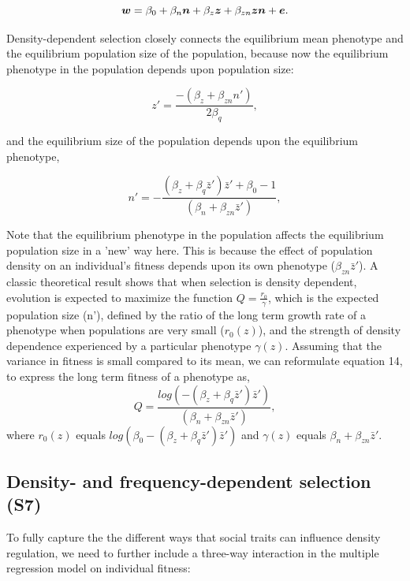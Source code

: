 \documentclass{article}
\begin{document}
\begin{equation} \label{eq: DDRS}
\vectorsym{w}=\beta_{0} +\beta_{n} \vectorsym{n} + \beta_{z} \vectorsym{z}+  \beta_{zn} \vectorsym{zn}  +  \vectorsym{e}.
\end{equation}

\noindent Density-dependent selection closely connects the equilibrium mean phenotype and the equilibrium population size of the population, because now the equilibrium phenotype in the population depends upon population size:

\begin{equation} 
z'=\frac{-(\beta_{z}+\beta_{zn}n')}{2\beta_{q}},
\end{equation} 

and the equilibrium size of the population depends upon the equilibrium phenotype,

\begin{equation}
		n' = -\frac{(\beta_{z}  +  \beta_{q}\bar{z}')\bar{z}'+\beta_{0} -1}{(\beta_{n} +  \beta_{zn} \bar{z}')},
\end{equation}

\noindent Note that the equilibrium phenotype in the population affects the equilibrium population size in a 'new' way here. This is because the effect of population density on an individual's fitness depends upon its own phenotype ($\beta_{zn} \bar{z}'$). A classic theoretical result \citep{MacArthur1962, Engen2013} shows that when selection is density dependent, evolution is expected to maximize the function $Q=\frac{r_0}{\gamma}$, which is the expected population size (n'), defined by the ratio of the long term growth rate of a phenotype when populations are very small ($r_0(z)$), and the strength of density dependence experienced by a particular phenotype $\gamma(z)$.  Assuming that the variance in fitness is small compared to its mean, we can reformulate equation 14, to express the long term fitness of a phenotype as,  $$Q=\frac{log(-(\beta_{z}  +  \beta_{q}\bar{z}')\bar{z}')}{(\beta_{n} +  \beta_{zn} \bar{z}')},$$ where  $r_0(z)$ equals $log(\beta_{0}-(\beta_{z}  +  \beta_{q}\bar{z}')\bar{z}')$ and $\gamma(z)$ equals $\beta_{n} +  \beta_{zn} \bar{z}'$.

\subsection{Density- and frequency-dependent selection (S7)}

To fully capture the the different ways that social traits can influence density regulation, we need to further include a three-way interaction in the multiple regression model on individual fitness:
\end{document}
